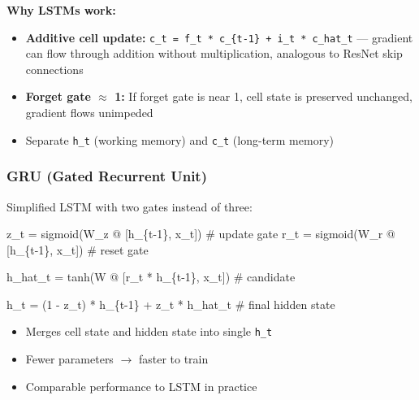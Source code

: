 \documentclass[11pt]{article}
\providecommand{\tightlist}{\setlength{\itemsep}{1pt}\setlength{\parskip}{0pt}}
\newenvironment{Shaded}{\begin{snugshade}}{\end{snugshade}}
\newcommand{\CommentTok}[1]{\textcolor[rgb]{0.48,0.49,0.49}{#1}}
\newcommand{\DecValTok}[1]{\textcolor[rgb]{0.96,0.45,0.00}{#1}}
\newcommand{\NormalTok}[1]{\textcolor[rgb]{0.81,0.81,0.76}{#1}}
\newcommand{\OperatorTok}[1]{\textcolor[rgb]{0.81,0.81,0.76}{#1}}
\begin{document}
\textbf{Why LSTMs work:}

\begin{itemize}
\tightlist
\item
  \textbf{Additive cell update:} \texttt{c\_t\ =\ f\_t\ *\ c\_\{t-1\}\ +\ i\_t\ *\ c\_hat\_t} --- gradient can flow through addition without multiplication, analogous to ResNet skip connections
\item
  \textbf{Forget gate \(\approx\) 1:} If forget gate is near 1, cell state is preserved unchanged, gradient flows unimpeded
\item
  Separate \texttt{h\_t} (working memory) and \texttt{c\_t} (long-term memory)
\end{itemize}

\subsubsection{GRU (Gated Recurrent Unit)}\label{gru-gated-recurrent-unit}

Simplified LSTM with two gates instead of three:


\begin{Shaded}
\begin{Highlighting}[]
\NormalTok{z\_t }\OperatorTok{=}\NormalTok{ sigmoid(W\_z }\OperatorTok{@}\NormalTok{ [h\_\{t}\OperatorTok{{-}}\DecValTok{1}\NormalTok{\}, x\_t])   }\CommentTok{\# update gate}
\NormalTok{r\_t }\OperatorTok{=}\NormalTok{ sigmoid(W\_r }\OperatorTok{@}\NormalTok{ [h\_\{t}\OperatorTok{{-}}\DecValTok{1}\NormalTok{\}, x\_t])   }\CommentTok{\# reset gate}

\NormalTok{h\_hat\_t }\OperatorTok{=}\NormalTok{ tanh(W }\OperatorTok{@}\NormalTok{ [r\_t }\OperatorTok{*}\NormalTok{ h\_\{t}\OperatorTok{{-}}\DecValTok{1}\NormalTok{\}, x\_t])  }\CommentTok{\# candidate}

\NormalTok{h\_t }\OperatorTok{=}\NormalTok{ (}\DecValTok{1} \OperatorTok{{-}}\NormalTok{ z\_t) }\OperatorTok{*}\NormalTok{ h\_\{t}\OperatorTok{{-}}\DecValTok{1}\NormalTok{\} }\OperatorTok{+}\NormalTok{ z\_t }\OperatorTok{*}\NormalTok{ h\_hat\_t  }\CommentTok{\# final hidden state}
\end{Highlighting}
\end{Shaded}

\begin{itemize}
\tightlist
\item
  Merges cell state and hidden state into single \texttt{h\_t}
\item
  Fewer parameters \(\rightarrow\) faster to train
\item
  Comparable performance to LSTM in practice
\end{itemize}
\end{document}
